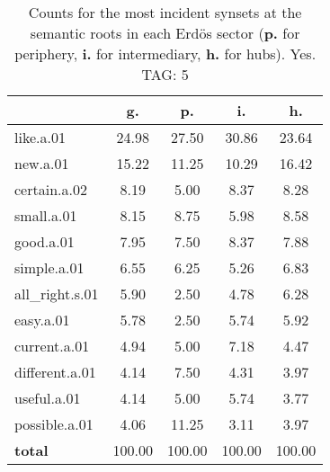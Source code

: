 \begin{table}[h!]
\begin{center}
\begin{tabular}{| l || c | c | c | c |}\hline
 & {\bf g.} & {\bf p.} & {\bf i.} & {\bf h.} \\\hline\hline
like.a.01 & 24.98  & 27.50  & 30.86  & 23.64 \\\hline
new.a.01 & 15.22  & 11.25  & 10.29  & 16.42 \\\hline
certain.a.02 & 8.19  & 5.00  & 8.37  & 8.28 \\\hline
small.a.01 & 8.15  & 8.75  & 5.98  & 8.58 \\\hline
good.a.01 & 7.95  & 7.50  & 8.37  & 7.88 \\\hline
simple.a.01 & 6.55  & 6.25  & 5.26  & 6.83 \\\hline
all\_right.s.01 & 5.90  & 2.50  & 4.78  & 6.28 \\\hline
easy.a.01 & 5.78  & 2.50  & 5.74  & 5.92 \\\hline
current.a.01 & 4.94  & 5.00  & 7.18  & 4.47 \\\hline
different.a.01 & 4.14  & 7.50  & 4.31  & 3.97 \\\hline
useful.a.01 & 4.14  & 5.00  & 5.74  & 3.77 \\\hline
possible.a.01 & 4.06  & 11.25  & 3.11  & 3.97 \\\hline\hline
{{\bf total}} & 100.00  & 100.00  & 100.00  & 100.00 \\\hline
\end{tabular}
\caption{Counts for the most incident synsets at the semantic roots in each Erd\"os sector ({\bf p.} for periphery, {\bf i.} for intermediary, {\bf h.} for hubs). Yes. TAG: 5}
\end{center}
\end{table}